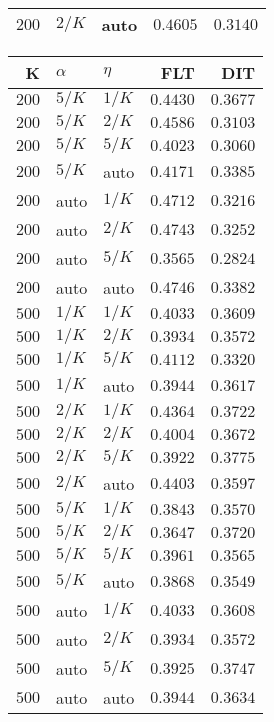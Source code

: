\begin{table}
\begin{spacing}{1.2}
{\begin{tabular}{rll|rr}
$200$ &  $2/K$ &   auto &      $0.4605$ & $0.3140$ \\
\bottomrule
\end{tabular}
} \hfill \parbox{.45\linewidth}{\centering \begin{tabular}{rll|rr}
\toprule
    K &  $\alpha$ &    $\eta$ &      FLT &           DIT \\
\midrule
$200$ &  $5/K$ &  $1/K$ & $0.4430$ &      $0.3677$ \\
$200$ &  $5/K$ &  $2/K$ & $0.4586$ &      $0.3103$ \\
$200$ &  $5/K$ &  $5/K$ & $0.4023$ &      $0.3060$ \\
$200$ &  $5/K$ &   auto & $0.4171$ &      $0.3385$ \\
$200$ &   auto &  $1/K$ & $0.4712$ &      $0.3216$ \\
$200$ &   auto &  $2/K$ & $0.4743$ &      $0.3252$ \\
$200$ &   auto &  $5/K$ & $0.3565$ &      $0.2824$ \\
$200$ &   auto &   auto & $0.4746$ &      $0.3382$ \\
\myrowcolor $500$ &  $1/K$ &  $1/K$ & $0.4033$ &      $0.3609$ \\
$500$ &  $1/K$ &  $2/K$ & $0.3934$ &      $0.3572$ \\
$500$ &  $1/K$ &  $5/K$ & $0.4112$ &      $0.3320$ \\
$500$ &  $1/K$ &   auto & $0.3944$ &      $0.3617$ \\
$500$ &  $2/K$ &  $1/K$ & $0.4364$ &      $0.3722$ \\
$500$ &  $2/K$ &  $2/K$ & $0.4004$ &      $0.3672$ \\
$500$ &  $2/K$ &  $5/K$ & $0.3922$ & $\bm{0.3775}$ \\
$500$ &  $2/K$ &   auto & $0.4403$ &      $0.3597$ \\
$500$ &  $5/K$ &  $1/K$ & $0.3843$ &      $0.3570$ \\
$500$ &  $5/K$ &  $2/K$ & $0.3647$ &      $0.3720$ \\
$500$ &  $5/K$ &  $5/K$ & $0.3961$ &      $0.3565$ \\
$500$ &  $5/K$ &   auto & $0.3868$ &      $0.3549$ \\
$500$ &   auto &  $1/K$ & $0.4033$ &      $0.3608$ \\
$500$ &   auto &  $2/K$ & $0.3934$ &      $0.3572$ \\
$500$ &   auto &  $5/K$ & $0.3925$ &      $0.3747$ \\
$500$ &   auto &   auto & $0.3944$ &      $0.3634$ \\
\bottomrule
\end{tabular}
}
\end{spacing}
\end{table}
